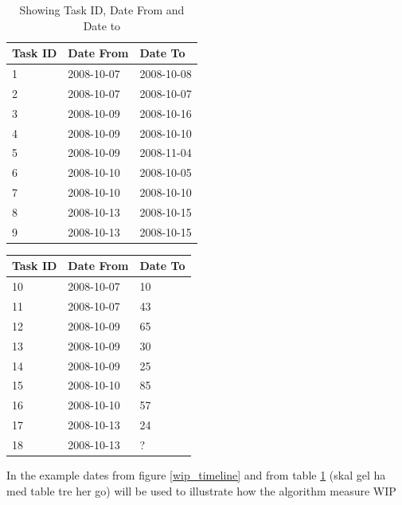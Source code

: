 \documentclass[UKenglish]{ifimaster}  %
\begin{document}
\begin{table}[ht]
\begin{center}
    \begin{tabular}{| l | l | p{5cm} |}
    \hline
   Task ID &   Date From  & Date To\\ \hline
     1 & 2008-10-07 & 2008-10-08   \\ \hline
     2 & 2008-10-07 & 2008-10-07   \\ \hline
     3 & 2008-10-09 & 2008-10-16   \\ \hline
     4 & 2008-10-09 & 2008-10-10   \\ \hline
     5 & 2008-10-09 & 2008-11-04   \\ \hline
     6 & 2008-10-10 & 2008-10-05   \\ \hline
     7 & 2008-10-10 & 2008-10-10   \\ \hline
     8 & 2008-10-13 & 2008-10-15   \\ \hline
     9 & 2008-10-13 & 2008-10-15   \\ \hline
    \end{tabular}
\caption{Showing Task ID, Date From and Date to}
\label{wt:2} %
\end{center}
\end{table}

\begin{center}
    \begin{tabular}{| l | l | p{5cm} |}
    \hline
   Task ID &   Date From  & Date To\\ \hline
     10 & 2008-10-07 & 10\\ \hline
     11 & 2008-10-07 &    43\\ \hline
     12 & 2008-10-09 & 65   \\ \hline
     13 & 2008-10-09 & 30   \\ \hline
     14 & 2008-10-09 & 25   \\ \hline
     15 & 2008-10-10 & 85   \\ \hline
     16 & 2008-10-10 & 57   \\ \hline
     17 & 2008-10-13 & 24   \\ \hline
     18 & 2008-10-13 & ?  \\ \hline
    \end{tabular}

\label{wt:3} %
\end{center}

In the example dates from figure \ref{wip_timeline} and from table \ref{wt:2} (skal gel ha med table tre her go) will be used to illustrate how the algorithm measure WIP
\end{document}
